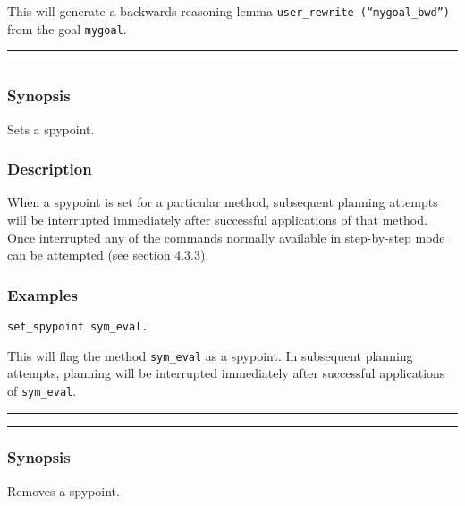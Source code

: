 \noindent This will generate a backwards reasoning lemma {\tt user\_rewrite (``mygoal\_bwd'')} from the goal {\tt mygoal}.


\vspace{2mm} \hrule \vspace{2mm}
\begin{Large}
\end{Large}
\vspace{2mm}
\hrule
\vspace{2mm}


\subsubsection*{Synopsis}
Sets a spypoint.

\subsubsection*{Description}
When a spypoint is set for a particular method, subsequent planning
attempts will be interrupted immediately after successful applications
of that method.  Once interrupted any of the commands normally
available in step-by-step mode can be attempted (see section 4.3.3).

\subsubsection*{Examples}
{\tt set\_spypoint sym\_eval.} 

\noindent This will flag the method {\tt sym\_eval} as a spypoint.  
In subsequent planning attempts, planning will be interrupted
immediately after successful applications of {\tt sym\_eval}. \\

\vspace{2mm}
\hrule
\vspace{2mm}
\begin{Large}
\end{Large}
\vspace{2mm}
\hrule
\vspace{2mm}


\subsubsection*{Synopsis}
Removes a spypoint.

